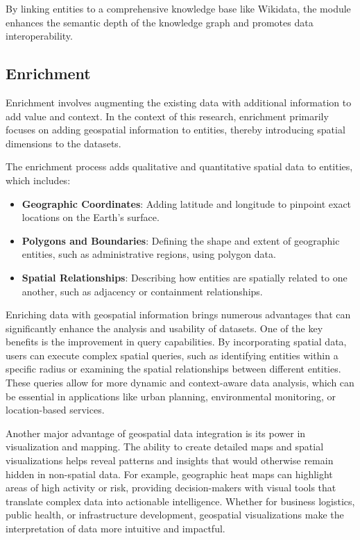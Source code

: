 By linking entities to a comprehensive knowledge base like Wikidata, the module enhances the semantic depth of the knowledge graph and promotes data interoperability.

\subsection{Enrichment}\label{VI-subsec:enrichment}

Enrichment involves augmenting the existing data with additional information to add value and context. In the context of this research, enrichment primarily focuses on adding geospatial information to entities, thereby introducing spatial dimensions to the datasets.


The enrichment process adds qualitative and quantitative spatial data to entities, which includes:

\begin{itemize}
    \item \textbf{Geographic Coordinates}: Adding latitude and longitude to pinpoint exact locations on the Earth's surface.
    \item \textbf{Polygons and Boundaries}: Defining the shape and extent of geographic entities, such as administrative regions, using polygon data.
    \item \textbf{Spatial Relationships}: Describing how entities are spatially related to one another, such as adjacency or containment relationships.
\end{itemize}

Enriching data with geospatial information brings numerous advantages that can significantly enhance the analysis and usability of datasets. One of the key benefits is the improvement in query capabilities. By incorporating spatial data, users can execute complex spatial queries, such as identifying entities within a specific radius or examining the spatial relationships between different entities. These queries allow for more dynamic and context-aware data analysis, which can be essential in applications like urban planning, environmental monitoring, or location-based services.

Another major advantage of geospatial data integration is its power in visualization and mapping. The ability to create detailed maps and spatial visualizations helps reveal patterns and insights that would otherwise remain hidden in non-spatial data. For example, geographic heat maps can highlight areas of high activity or risk, providing decision-makers with visual tools that translate complex data into actionable intelligence. Whether for business logistics, public health, or infrastructure development, geospatial visualizations make the interpretation of data more intuitive and impactful.

